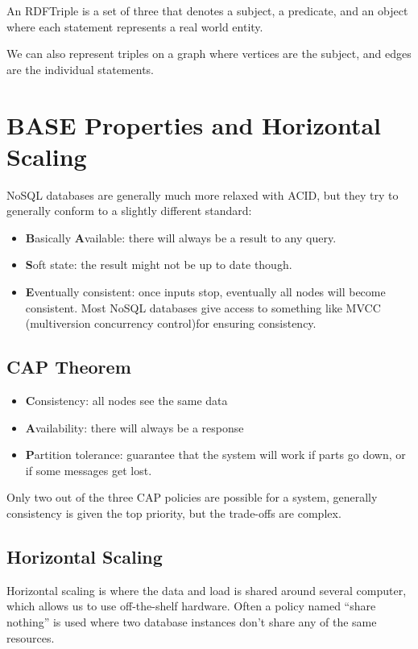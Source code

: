 An RDFTriple is a set of three that denotes a subject, a predicate, and an object where each statement represents a real world entity.

We can also represent triples on a graph where vertices are the subject, and edges are the individual statements.

\section{BASE Properties and Horizontal Scaling}\label{sec:base_properties_and_horizontal_scaling}

NoSQL databases are generally much more relaxed with ACID, but they try to generally conform to a slightly different standard:
\begin{itemize}
    \item \textbf{B}asically \textbf{A}vailable: there will always be a result to any query.
    \item \textbf{S}oft state: the result might not be up to date though.
    \item \textbf{E}ventually consistent: once inputs stop, eventually all nodes will become consistent. Most NoSQL databases give access to something like MVCC (multiversion concurrency control)for ensuring consistency.
\end{itemize}

\subsection{CAP Theorem}\label{sub:cap_theorem}

\begin{itemize}
    \item \textbf{C}onsistency: all nodes see the same data
    \item \textbf{A}vailability: there will always be a response
    \item \textbf{P}artition tolerance: guarantee that the system will work if parts go down, or if some messages get lost.
\end{itemize}
Only two out of the three CAP policies are possible for a system, generally consistency is given the top priority, but the trade-offs are complex.

\subsection{Horizontal Scaling}\label{sub:horizontal_scaling}

Horizontal scaling is where the data and load is shared around several computer, which allows us to use off-the-shelf hardware.
Often a policy named ``share nothing'' is used where two database instances don't share any of the same resources.

